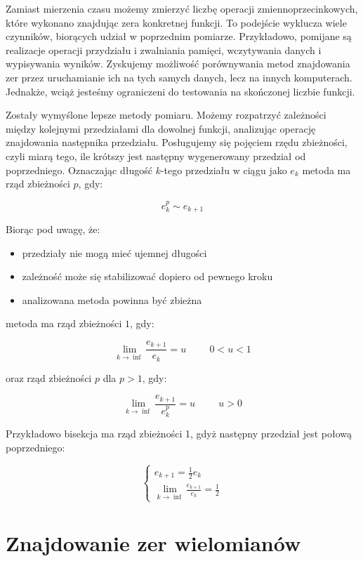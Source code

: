 \documentclass{article}
\begin{document}
Zamiast mierzenia czasu możemy zmierzyć liczbę operacji zmiennoprzecinkowych, które wykonano znajdując zera konkretnej funkcji. To podejście wyklucza wiele czynników, biorących udział w poprzednim pomiarze. Przykładowo, pomijane są realizacje operacji przydziału i zwalniania pamięci, wczytywania danych i wypisywania wyników. Zyskujemy możliwość porównywania metod znajdowania zer przez uruchamianie ich na tych samych danych, lecz na innych komputerach. Jednakże, wciąż jesteśmy ograniczeni do testowania na skończonej liczbie funkcji. 

Zostały wymyślone lepsze metody pomiaru. Możemy rozpatrzyć zależności między kolejnymi przedziałami dla dowolnej funkcji, analizując operację znajdowania następnika przedziału. Posługujemy się pojęciem rzędu zbieżności, czyli miarą tego, ile krótszy jest następny wygenerowany przedział od poprzedniego. Oznaczając długość $k$-tego przedziału w ciągu jako $e_k$ metoda ma rząd zbieżności $p$, gdy:

$$e_k^p \sim e_{k+1}$$

Biorąc pod uwagę, że:
\begin{itemize}
\item przedziały nie mogą mieć ujemnej długości
\item zależność może się stabilizować dopiero od pewnego kroku
\item analizowana metoda powinna być zbieżna
\end{itemize}

metoda ma rząd zbieżności $1$, gdy:

$$\lim_{k \rightarrow \inf}\frac{e_{k+1}}{e_k} = u\hspace{1cm}0<u<1$$

oraz rząd zbieżności $p$ dla $p>1$, gdy:

$$\lim_{k\rightarrow\inf}\frac{e_{k+1}}{e_k^p} = u\hspace{1cm}u>0$$

Przykładowo bisekcja ma rząd zbieżności 1, gdyż następny przedział jest połową poprzedniego:

\begin{equation}
\begin{cases}
e_{k+1}=\frac{1}{2}e_k \\
\lim_{k \rightarrow \inf}\frac{e_{k+1}}{e_k}=\frac{1}{2}
\end{cases}
\end{equation}

\section{Znajdowanie zer wielomianów}
\end{document}
